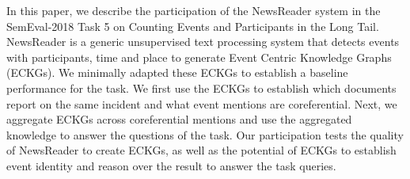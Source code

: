In this paper, we describe the participation of the NewsReader system in the SemEval-2018 Task 5 on Counting Events and Participants in the Long Tail. NewsReader is a generic unsupervised text processing system that detects events with participants, time and place to generate Event Centric Knowledge Graphs (ECKGs). We  minimally adapted these ECKGs to establish a baseline performance for the task. We first use the ECKGs to establish which documents report on the same incident and what event mentions are coreferential. Next, we aggregate ECKGs across coreferential mentions and use the aggregated knowledge to answer the questions of the task. Our participation tests the quality of NewsReader to create ECKGs, as well as the potential of ECKGs to establish event identity and reason over the result to answer the task queries.

